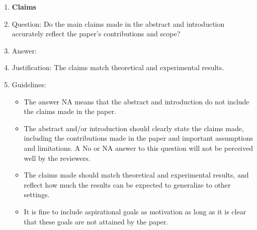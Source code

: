 \documentclass{article}
\begin{document}
\begin{enumerate}

\item {\bf Claims}
    \item[] Question: Do the main claims made in the abstract and introduction accurately reflect the paper's contributions and scope?
    \item[] Answer: \answerYes{} %
    \item[] Justification: The claims match theoretical and experimental results.
    \item[] Guidelines:
    \begin{itemize}
        \item The answer NA means that the abstract and introduction do not include the claims made in the paper.
        \item The abstract and/or introduction should clearly state the claims made, including the contributions made in the paper and important assumptions and limitations. A No or NA answer to this question will not be perceived well by the reviewers. 
        \item The claims made should match theoretical and experimental results, and reflect how much the results can be expected to generalize to other settings. 
        \item It is fine to include aspirational goals as motivation as long as it is clear that these goals are not attained by the paper. 
    \end{itemize}


\end{enumerate}
\end{document}
